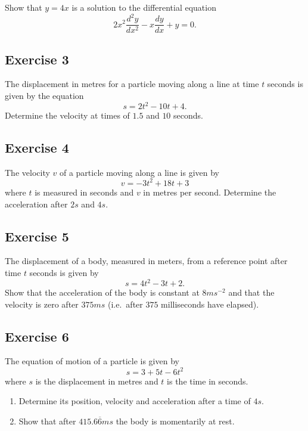 \documentclass[
  english,
  11pt,
  oneside]{book}
\providecommand{\tightlist}{%
  \setlength{\itemsep}{0pt}\setlength{\parskip}{0pt}}
\newcommand{\slide}{}
\theoremstyle{definition}
\theoremstyle{definition}
\theoremstyle{definition}
\theoremstyle{definition}
\theoremstyle{remark}
\begin{document}
Show that \(y=4x\) is a solution to the differential equation
\[
2x^2\frac{d^2y}{dx^2}-x\frac{dy}{dx}+y=0.
\]

\slide

\subsection*{Exercise 3}\label{exercise-3-1}

The displacement in metres for a particle moving along a line at time \(t\) seconds is given by the equation
\[
s=2t^2-10t+4.
\]
Determine the velocity at times of \(1.5\) and \(10\) seconds.

\slide

\subsection*{Exercise 4}\label{exercise-4-1}

The velocity \(v\) of a particle moving along a line is given by
\[
v=-3t^2+18t+3
\]
where \(t\) is measured in seconds and \(v\) in metres per second. Determine the acceleration after \(2s\) and \(4s\).
\slide

\subsection*{Exercise 5}\label{exercise-5}

The displacement of a body, measured in meters, from a reference point after time \(t\) seconds is given by
\[
s=4t^2-3t+2.
\]
Show that the acceleration of the body is constant at \(8ms^{-2}\) and that the velocity is zero after \(375ms\) (i.e.~after \(375\) milliseconds have elapsed).
\slide

\subsection*{Exercise 6}\label{exercise-6}

The equation of motion of a particle is given by
\[
s=3+5t-6t^2
\]
where \(s\) is the displacement in metres and \(t\) is the time in seconds.

\begin{enumerate}
\def\labelenumi{\alph{enumi}.}
\tightlist
\item
  Determine its position, velocity and acceleration after a time of \(4s\).
\item
  Show that after \(415.6\overline{6}ms\) the body is momentarily at rest.
\end{enumerate}
\end{document}
